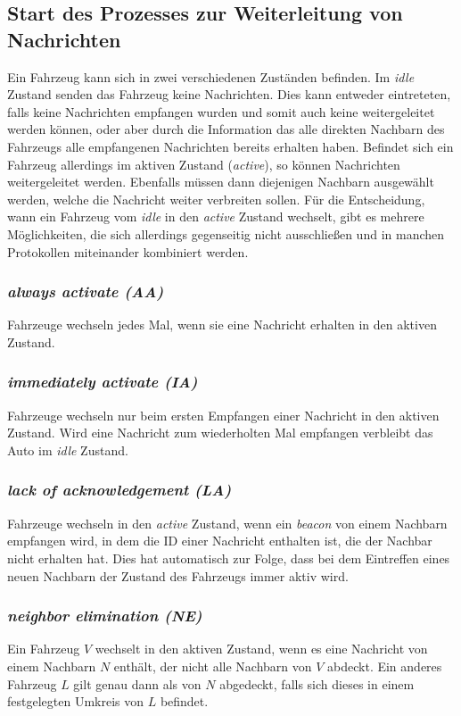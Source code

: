 \documentclass[english,runningheads,a4paper]{llncs}[2018/03/10]
\begin{document}
\subsection{Start des Prozesses zur Weiterleitung von Nachrichten}\label{subsec:forwarder-selection}
Ein Fahrzeug kann sich in zwei verschiedenen Zuständen befinden.
Im \textit{idle} Zustand senden das Fahrzeug keine Nachrichten.
Dies kann entweder eintreteten, falls keine Nachrichten empfangen wurden und somit auch keine weitergeleitet werden können, oder aber durch die Information das alle direkten Nachbarn des Fahrzeugs alle empfangenen Nachrichten bereits erhalten haben.
Befindet sich ein Fahrzeug allerdings im aktiven Zustand (\textit{active}), so können Nachrichten weitergeleitet werden.
Ebenfalls müssen dann diejenigen Nachbarn ausgewählt werden, welche die Nachricht weiter verbreiten sollen.
Für die Entscheidung, wann ein Fahrzeug vom \textit{idle} in den \textit{active} Zustand wechselt, gibt es mehrere Möglichkeiten, die sich allerdings gegenseitig nicht ausschließen und in manchen Protokollen miteinander kombiniert werden.
\subsubsection{\textit{always activate (AA)}}
Fahrzeuge wechseln jedes Mal, wenn sie eine Nachricht erhalten in den aktiven Zustand.
\subsubsection{\textit{immediately activate (IA)}}
Fahrzeuge wechseln nur beim ersten Empfangen einer Nachricht in den aktiven Zustand.
Wird eine Nachricht zum wiederholten Mal empfangen verbleibt das Auto im \textit{idle} Zustand.
\subsubsection{\textit{lack of acknowledgement (LA)}}
Fahrzeuge wechseln in den \textit{active} Zustand, wenn ein \textit{beacon} von einem Nachbarn empfangen wird, in dem die ID einer Nachricht enthalten ist, die der Nachbar nicht erhalten hat.
Dies hat automatisch zur Folge, dass bei dem Eintreffen eines neuen Nachbarn der Zustand des Fahrzeugs immer aktiv wird.
\subsubsection{\textit{neighbor elimination (NE)}}
Ein Fahrzeug $V$ wechselt in den aktiven Zustand, wenn es eine Nachricht von einem Nachbarn $N$ enthält, der nicht alle Nachbarn von $V$ abdeckt.
Ein anderes Fahrzeug $L$ gilt genau dann als von $N$ abgedeckt, falls sich dieses in einem festgelegten Umkreis von $L$ befindet\cite{conti2013mobile}.
\end{document}
